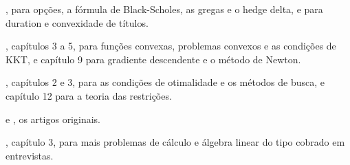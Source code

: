 \begin{leituras}
  \item \citet{hull2022}, para opções, a fórmula de Black-Scholes, as gregas e o hedge delta, e para duration e convexidade de títulos.
  \item \citet{boyd2004}, capítulos 3 a 5, para funções convexas, problemas convexos e as condições de KKT, e capítulo 9 para gradiente descendente e o método de Newton.
  \item \citet{nocedal2006}, capítulos 2 e 3, para as condições de otimalidade e os métodos de busca, e capítulo 12 para a teoria das restrições.
  \item \citet{black1973} e \citet{merton1973}, os artigos originais.
  \item \citet{zhou2008}, capítulo 3, para mais problemas de cálculo e álgebra linear do tipo cobrado em entrevistas.
\end{leituras}
